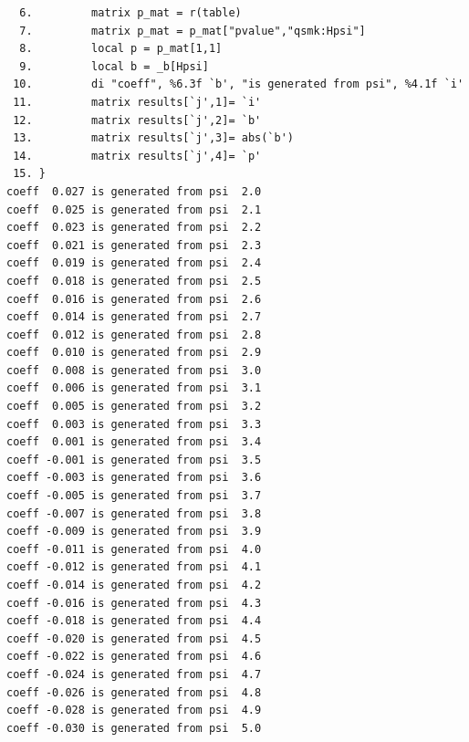 \documentclass[
  10pt,
  a4paper,
]{book}
\begin{document}
\begin{verbatim}
  6.         matrix p_mat = r(table)
  7.         matrix p_mat = p_mat["pvalue","qsmk:Hpsi"]
  8.         local p = p_mat[1,1]
  9.         local b = _b[Hpsi]
 10.         di "coeff", %6.3f `b', "is generated from psi", %4.1f `i'
 11.         matrix results[`j',1]= `i'
 12.         matrix results[`j',2]= `b'
 13.         matrix results[`j',3]= abs(`b')
 14.         matrix results[`j',4]= `p'
 15. }
coeff  0.027 is generated from psi  2.0
coeff  0.025 is generated from psi  2.1
coeff  0.023 is generated from psi  2.2
coeff  0.021 is generated from psi  2.3
coeff  0.019 is generated from psi  2.4
coeff  0.018 is generated from psi  2.5
coeff  0.016 is generated from psi  2.6
coeff  0.014 is generated from psi  2.7
coeff  0.012 is generated from psi  2.8
coeff  0.010 is generated from psi  2.9
coeff  0.008 is generated from psi  3.0
coeff  0.006 is generated from psi  3.1
coeff  0.005 is generated from psi  3.2
coeff  0.003 is generated from psi  3.3
coeff  0.001 is generated from psi  3.4
coeff -0.001 is generated from psi  3.5
coeff -0.003 is generated from psi  3.6
coeff -0.005 is generated from psi  3.7
coeff -0.007 is generated from psi  3.8
coeff -0.009 is generated from psi  3.9
coeff -0.011 is generated from psi  4.0
coeff -0.012 is generated from psi  4.1
coeff -0.014 is generated from psi  4.2
coeff -0.016 is generated from psi  4.3
coeff -0.018 is generated from psi  4.4
coeff -0.020 is generated from psi  4.5
coeff -0.022 is generated from psi  4.6
coeff -0.024 is generated from psi  4.7
coeff -0.026 is generated from psi  4.8
coeff -0.028 is generated from psi  4.9
coeff -0.030 is generated from psi  5.0




\end{verbatim}
\end{document}
